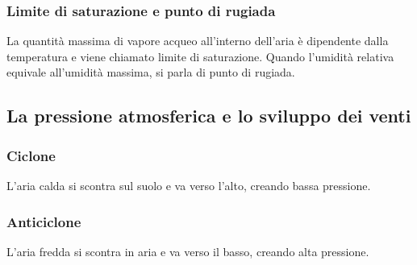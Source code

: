 \documentclass{article}
\begin{document}
\subsubsection{Limite di saturazione e punto di rugiada}
La quantità massima di vapore acqueo all'interno dell'aria è dipendente dalla temperatura e
viene chiamato limite di saturazione. Quando l'umidità relativa equivale all'umidità massima,
si parla di punto di rugiada.


\subsection{La pressione atmosferica e lo sviluppo dei venti}

\subsubsection{Ciclone}
L'aria calda si scontra sul suolo e va verso l'alto, creando bassa pressione.

\subsubsection{Anticiclone}
L'aria fredda si scontra in aria e va verso il basso, creando alta pressione.

\vspace*{.8cm}
\end{document}
